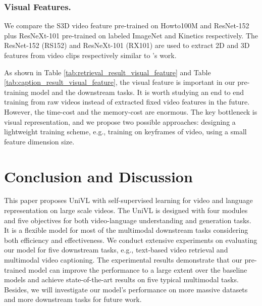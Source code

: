 \documentclass[11pt,a4paper]{article}
\begin{document}
	\subsubsection{Visual Features.}
	\label{sec:visual_features}
	We compare the S3D video feature pre-trained on Howto100M and ResNet-152 plus ResNeXt-101 pre-trained on labeled ImageNet and Kinetics respectively. The ResNet-152 (RS152) and ResNeXt-101 (RX101) are used to extract 2D and 3D features from video clips respectively similar to \citet{miech2019howto100m}'s work. 
	
	As shown in Table \ref{tab:retrieval_result_visual_feature} and Table \ref{tab:caption_result_visual_feature}, the visual feature is important in our pre-training model and the downstream tasks. It is worth studying an end to end training from raw videos instead of extracted fixed video features in the future. However, the time-cost and the memory-cost are enormous. The key bottleneck is visual representation, and we propose two possible approaches: designing a lightweight training scheme, e.g., training on keyframes of video, using a small feature dimension size. 

	\section{Conclusion and Discussion}
	This paper proposes UniVL with self-supervised learning for video and language representation on large scale videos. The UniVL is designed with four modules and five objectives for both video-language understanding and generation tasks. It is a flexible model for most of the multimodal downstream tasks considering both efficiency and effectiveness. We conduct extensive experiments on evaluating our model for five downstream tasks, e.g., text-based video retrieval and multimodal video captioning. The experimental results demonstrate that our pre-trained model can improve the performance to a large extent over the baseline models and achieve state-of-the-art results on five typical multimodal tasks. Besides, we will investigate our model's performance on more massive datasets and more downstream tasks for future work.
	
	
	
\end{document}
